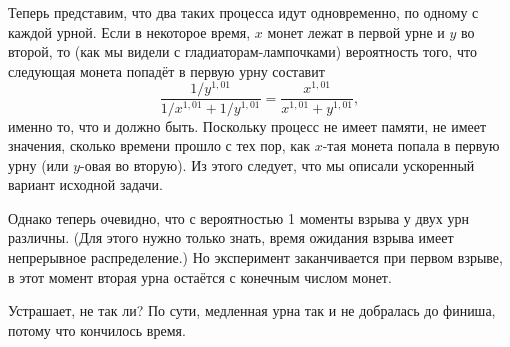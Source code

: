 Теперь представим, что два таких процесса идут одновременно, по одному с каждой урной.
Если в некоторое время, $x$ монет лежат в первой урне и $y$ во второй, то (как мы видели с гладиаторам-лампочками) %
вероятность того, что следующая монета попадёт в первую урну составит
\[\frac{1/y^{1{,}01}}{1/x^{1{,}01}+1/y^{1{,}01}}=\frac{x^{1{,}01}}{x^{1{,}01}+y^{1{,}01}},\]
именно то, что и должно быть.
Поскольку процесс не имеет памяти,
не имеет значения, сколько времени прошло с тех пор, как $x$-тая монета попала в первую урну (или $y$-овая во вторую).
Из этого следует, что мы описали ускоренный вариант исходной задачи.

Однако теперь очевидно, что с вероятностью 1 моменты взрыва у двух урн различны.
(Для этого нужно только знать, время ожидания взрыва имеет непрерывное распределение.)
Но эксперимент заканчивается при первом взрыве, в этот момент вторая урна остаётся с конечным числом монет.\heart

Устрашает, не так ли?
По сути, медленная урна так и не добралась до финиша, потому что кончилось время.
